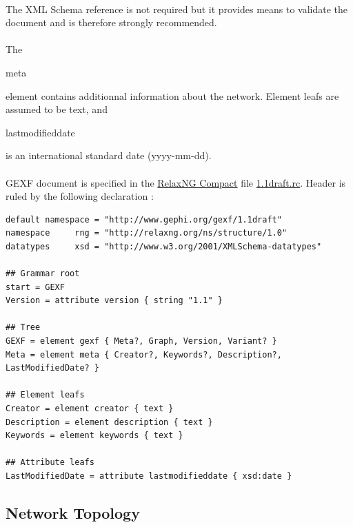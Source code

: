 \documentclass[a4paper,10pt]{article}
\begin{document}
\paragraph{}
The XML Schema reference is not required but it provides means to validate the document and is therefore strongly recommended.

\paragraph{}
The \begin{footnotesize}meta\end{footnotesize} element contains additionnal information about the network. Element leafs are assumed to be text, and \begin{footnotesize}lastmodifieddate\end{footnotesize} is an international standard date (yyyy-mm-dd).

\paragraph{}
GEXF document is specified in the \href{http://relaxng.org/compact-tutorial-20030326.html}{RelaxNG Compact} file \href{http://gephi.org/gexf/1.1draft.rnc}{1.1draft.rc}. Header is ruled by the following declaration :

\lstset{ style=rnc }
\begin{lstlisting}[caption={Header Specification},label=headerRNC]
default namespace = "http://www.gephi.org/gexf/1.1draft"
namespace     rng = "http://relaxng.org/ns/structure/1.0"
datatypes     xsd = "http://www.w3.org/2001/XMLSchema-datatypes"

## Grammar root
start = GEXF
Version = attribute version { string "1.1" }

## Tree
GEXF = element gexf { Meta?, Graph, Version, Variant? }
Meta = element meta { Creator?, Keywords?, Description?, LastModifiedDate? }

## Element leafs
Creator = element creator { text }
Description = element description { text }
Keywords = element keywords { text }

## Attribute leafs
LastModifiedDate = attribute lastmodifieddate { xsd:date }
\end{lstlisting}

\subsection{Network Topology} \label{networktopology}
\end{document}
